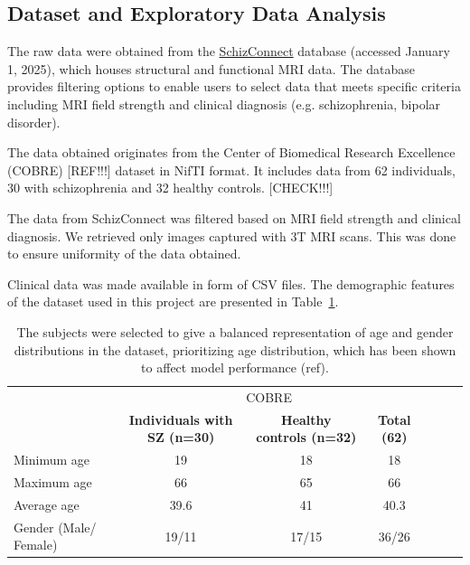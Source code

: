 \subsection{Dataset and Exploratory Data Analysis}

The raw data were obtained from the \href{http://schizconnect.org}{SchizConnect} database (accessed January 1, 2025), which houses structural and functional MRI data. The database provides filtering options to enable users to select data that meets specific criteria including MRI field strength and clinical diagnosis (e.g. schizophrenia, bipolar disorder).

The data obtained originates from the Center of Biomedical Research Excellence (COBRE) [REF!!!] dataset in NifTI format. It includes data from 62 individuals, 30 with schizophrenia and 32 healthy controls. [CHECK!!!]

The data from SchizConnect was filtered based on MRI field strength and clinical diagnosis. We retrieved only images captured with 3T MRI scans. This was done to ensure uniformity of the data obtained.

Clinical data was made available in form of CSV files. The demographic features of the dataset used in this project are presented in Table~\ref{tab:cobre_clinical_demographic}.
\begin{center}
	\begin{table}
        \centering
        \caption{\label{tab:cobre_clinical_demographic}The subjects were selected to give a balanced representation of age and gender distributions in the dataset, prioritizing age distribution, which has been shown to affect model performance (ref).}
        \begin{tabular*}{500pt}{@{\extracolsep\fill}lcccccc@{\extracolsep\fill}}
            \toprule
            & \multicolumn{3}{c}{COBRE}
            \\\cmidrule{2-4}
            & \textbf{Individuals with SZ (n=30)} & \textbf{Healthy controls (n=32)} & \textbf{Total (62)} \\
            \midrule
            Minimum age             & 19  & 18  & 18 \\
            Maximum age 		    & 66  & 65 & 66  \\
            Average age             & 39.6 & 41 & 40.3	\\
            Gender (Male/ Female)   & 19/11 & 17/15 & 36/26	\\
            \bottomrule
        \end{tabular*}
    \end{table}    
\end{center}

